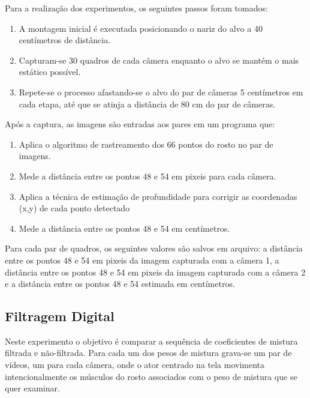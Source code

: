 Para a realização dos experimentos, os seguintes passos foram tomados:

\begin{enumerate}
      
\item A montagem inicial é executada posicionando o nariz do alvo a 40
  centímetros de distância.

\item Capturam-se 30 quadros de cada câmera enquanto o alvo se mantém o mais
  estático possível.

\item Repete-se o processo afastando-se o alvo do par de câmeras 5 centímetros
  em cada etapa, até que se atinja a distância de 80 cm do par de câmeras.

\end{enumerate}

Após a captura, as imagens são entradas aos pares em um programa que:

\begin{enumerate}

\item Aplica o algoritmo de rastreamento dos 66 pontos do rosto no par de
  imagens.

\item Mede a distância entre os pontos 48 e 54 em pixeis para cada câmera.

\item Aplica a técnica de estimação de profundidade para corrigir as coordenadas
  (x,y) de cada ponto detectado

\item Mede a distância entre os pontos 48 e 54 em centímetros.

\end{enumerate}

Para cada par de quadros, os seguintes valores são salvos em arquivo: a
distância entre os pontos 48 e 54 em pixeis da imagem capturada com a câmera 1,
a distância entre os pontos 48 e 54 em pixeis da imagem capturada com a câmera 2
e a distância entre os pontos 48 e 54 estimada em centímetros. 


\subsection{Filtragem Digital}

Neste experimento o objetivo é comparar a sequência de coeficientes de mistura
filtrada e não-filtrada.  Para cada um dos pesos de mistura grava-se um par de
vídeos, um para cada câmera, onde o ator centrado na tela movimenta
intencionalmente os músculos do rosto associados com o peso de mistura que se
quer examinar. 

